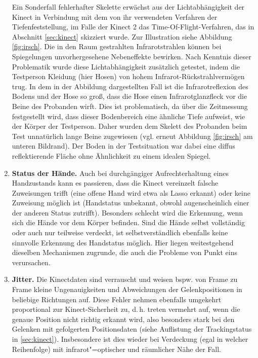 \begin{enumerate}[label=(\roman*)]
		Ein Sonderfall fehlerhafter Skelette erwächst aus der Lichtabhängigkeit der Kinect in Verbindung mit dem von ihr verwendeten Verfahren der Tiefenfeststellung, im Falle der Kinect 2 das Time-Of-Flight-Verfahren, das in Abschnitt \ref{sec:kinect} skizziert wurde. Zur Illustration siehe Abbildung \ref{fig:irsch}. Die in den Raum gestrahlten Infrarotstrahlen können bei Spiegelungen unvorhergesehene Nebeneffekte bewirken. Nach Kenntnis dieser Problematik wurde diese Lichtabhängigkeit zusätzlich getestet, indem die Testperson Kleidung (hier Hosen) von hohem Infrarot-Rückstrahlvermögen trug. In dem in der Abbildung dargestellten Fall ist die Infrarotreflexion des Bodens und der Hose so groß, dass die Hose einen \glqq{}Infrarotglanzfleck\grqq{} vor die Beine des Probanden wirft. Dies ist problematisch, da über die Zeitmessung festgestellt wird, dass dieser Bodenbereich eine ähnliche Tiefe aufweist, wie der Körper der Testperson. Daher wurden dem Skelett des Probanden beim Test unnatürlich lange Beine zugewiesen (vgl. erneut Abbildung \ref{fig:irsch} am unteren Bildrand). Der Boden in der Testsituation war dabei eine diffus reflektierende Fläche ohne Ähnlichkeit zu einem idealen Spiegel.\par
		\item\label{itm:problem2} \textbf{Status der Hände.} Auch bei durchgängiger Aufrechterhaltung eines Handzustands kann es passieren, dass die Kinect vereinzelt falsche Zuweisungen trifft (eine offene Hand wird etwa als Lasso erkannt) oder keine Zuweisung möglich ist (Handstatus unbekannt, obwohl augenscheinlich einer der anderen Status zutrifft). Besonders schlecht wird die Erkennung, wenn sich die Hände vor dem Körper befinden. Sind die Hände selbst vollständig oder auch nur teilweise verdeckt, ist selbstverständlich ebenfalls keine sinnvolle Erkennung des Handstatus möglich. Hier liegen weitestgehend dieselben Mechanismen zugrunde, die auch die Probleme von Punkt eins verursachen.  
		\item\label{itm:problem3} \textbf{Jitter.} Die Kinectdaten sind verrauscht und weisen bspw. von Frame zu Frame kleine Ungenauigkeiten und Abweichungen der Gelenkpositionen in beliebige Richtungen auf. Diese Fehler nehmen ebenfalls umgekehrt proportional zur Kinect-Sicherheit zu, d.\,h. treten vermehrt auf, wenn die genaue Position nicht richtig erkannt wird, also besonders stark bei den Gelenken mit gefolgerten Positionsdaten (siehe Auflistung der Trackingstatus in \ref{sec:kinect}). Insbesondere ist dies wieder bei Verdeckung (egal in welcher Reihenfolge) mit infrarot"=optischer und räumlicher Nähe der Fall.\par 

\end{enumerate}
